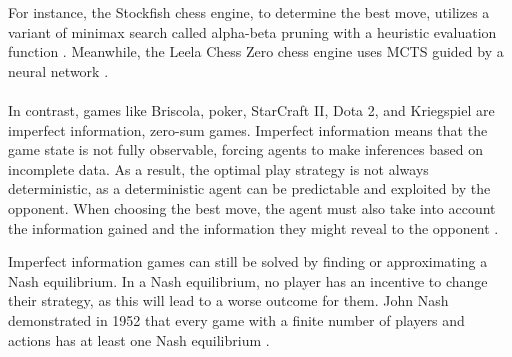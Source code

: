 For instance, the Stockfish chess engine, to determine the best move, utilizes a variant of minimax search called alpha-beta pruning with a heuristic evaluation function \cite{stockfish}. Meanwhile, the Leela Chess Zero chess engine uses MCTS guided by a neural network \cite{lc0}.\\\\
In contrast, games like Briscola, poker, StarCraft II, Dota 2, and Kriegspiel are imperfect information, zero-sum games. Imperfect information means that the game state is not fully observable, forcing agents to make inferences based on incomplete data. As a result, the optimal play strategy is not always deterministic, as a deterministic agent can be predictable and exploited by the opponent. When choosing the best move, the agent must also take into account the information gained and the information they might reveal to the opponent \cite{norvig-russell}.

Imperfect information games can still be solved by finding or approximating a Nash equilibrium. In a Nash equilibrium, no player has an incentive to change their strategy, as this will lead to a worse outcome for them. John Nash demonstrated in 1952 that every game with a finite number of players and actions has at least one Nash equilibrium \cite{nash-equilibrium-wikipedia}.


